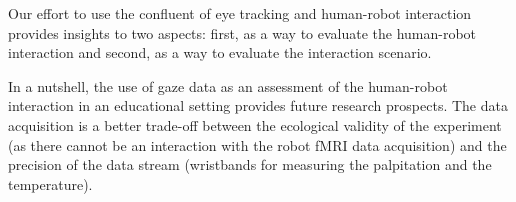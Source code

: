 \documentclass{sig-alternate}
\begin{document}



Our effort to use the confluent of eye tracking and human-robot
interaction provides insights to two aspects: first, as a way to
evaluate the human-robot interaction and second, as a way to evaluate
the interaction scenario.

%

In a nutshell, the use of gaze data as an assessment of the human-robot
interaction in an educational setting provides future research
prospects. The data acquisition is a better trade-off between the
ecological validity of the experiment (as there cannot be an interaction
with the robot fMRI data acquisition) and the precision of the data
stream (wristbands for measuring the palpitation and the temperature).
\end{document}
